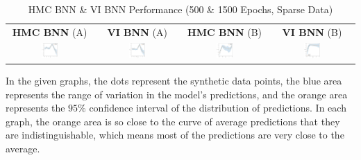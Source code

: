 \documentclass[conference]{IEEEtran}
\begin{document}
\begin{table}
\centering
\begin{tabular}{cccc}
\textbf{HMC BNN} (A) & \textbf{VI BNN} (A) & \textbf{HMC BNN} (B) & \textbf{VI BNN} (B)\\
\includegraphics[width=0.21\textwidth]{images/hmc_bnn--problem_A--sb--sparse_data.png} & \includegraphics[width=0.21\textwidth]{images/vi_bnn--problem_A--sb--sparse_data.png} & \includegraphics[width=0.21\textwidth]{images/hmc_bnn--problem_B--sb--sparse_data.png} & \includegraphics[width=0.21\textwidth]{images/vi_bnn--problem_B--sb--sparse_data.png}\\
\end{tabular}
\caption{HMC BNN \& VI BNN Performance (500 \& 1500 Epochs, Sparse Data)}
\label{tb3:table_of_figures}
\end{table}

In the given graphs, the dots represent the synthetic data points, the blue area represents the range of variation in the model's predictions, and the orange area represents the $95\%$ confidence interval of the distribution of predictions. In each graph, the orange area is so close to the curve of average predictions that they are indistinguishable, which means most of the predictions are very close to the average.\\
\end{document}
